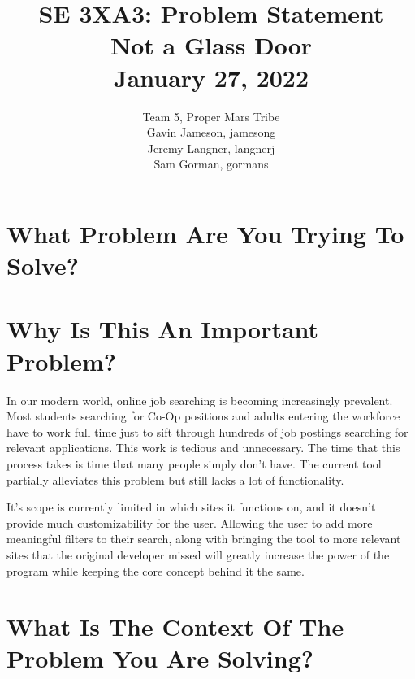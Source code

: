 \documentclass{article}
\title{SE 3XA3: Problem Statement\\Not a Glass Door\\January 27, 2022}
\author{Team 5, Proper Mars Tribe
		\\ Gavin Jameson, jamesong
		\\ Jeremy Langner, langnerj
		\\ Sam Gorman, gormans
}
\date{}
\begin{document}
\newpage

\maketitle

\section*{What Problem Are You Trying To Solve?}
\section*{Why Is This An Important Problem?}
In our modern world, online job searching is becoming increasingly prevalent. 
Most students searching for Co-Op positions and adults entering the workforce have to work full time 
just to sift through hundreds of job postings searching for relevant applications. This work is tedious 
and unnecessary. The time that this process takes is time that many people simply don’t have.
The current tool partially alleviates this problem but still lacks a lot of functionality. 

It’s scope is currently limited in which sites it functions on, and it doesn’t provide much 
customizability for the user. Allowing the user to add more meaningful filters to their search, 
along with bringing the tool to more relevant sites that the original developer missed will 
greatly increase the power of the program while keeping the core concept behind it the same.

\section*{What Is The Context Of The Problem You Are Solving?}

\iffalse
\wss{comment}

\ds{comment}

\mj{comment}

\cm{comment}

\mh{comment}
\fi
\end{document}
